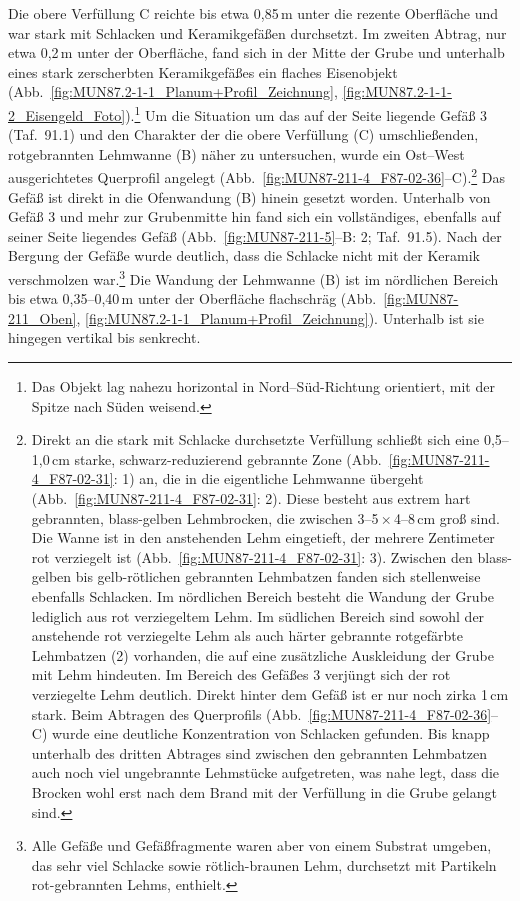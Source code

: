 Die obere Verfüllung C reichte bis etwa 0,85\,m unter die rezente Oberfläche und war stark mit Schlacken und Keramikgefäßen durchsetzt. Im zweiten Abtrag, nur etwa 0,2\,m unter der Oberfläche, fand sich in der Mitte der Grube und unterhalb eines stark zerscherbten Keramikgefäßes ein flaches Eisenobjekt (Abb.~\ref{fig:MUN87.2-1-1_Planum+Profil_Zeichnung}, \ref{fig:MUN87.2-1-1-2_Eisengeld_Foto}).\footnote{Das Objekt lag nahezu horizontal in Nord–Süd-Richtung orientiert, mit der Spitze nach Süden weisend.} Um die Situation um das auf der Seite liegende Gefäß 3 (Taf.~91.1) und den Charakter der die obere Verfüllung (C) umschließenden, rotgebrannten Lehmwanne (B) näher zu untersuchen, wurde ein Ost--West ausgerichtetes Querprofil angelegt (Abb.~\ref{fig:MUN87-211-4_F87-02-36}--C).\footnote{Direkt an die stark mit Schlacke durchsetzte Verfüllung schließt sich eine 0,5--1,0\,cm starke, schwarz-reduzierend gebrannte Zone (Abb.~\ref{fig:MUN87-211-4_F87-02-31}: 1) an, die in die eigentliche Lehmwanne übergeht (Abb.~\ref{fig:MUN87-211-4_F87-02-31}: 2). Diese besteht aus extrem hart gebrannten, blass-gelben Lehmbrocken, die zwischen 3--5\,$\times$\,4--8\,cm groß sind. Die Wanne ist in den anstehenden Lehm eingetieft, der mehrere Zentimeter rot verziegelt ist (Abb.~\ref{fig:MUN87-211-4_F87-02-31}: 3). Zwischen den blass-gelben bis gelb-rötlichen gebrannten Lehmbatzen fanden sich stellenweise ebenfalls Schlacken. Im nördlichen Bereich besteht die Wandung der Grube lediglich aus rot verziegeltem Lehm. Im südlichen Bereich sind sowohl der anstehende rot verziegelte Lehm als auch härter gebrannte rotgefärbte Lehmbatzen (2) vorhanden, die auf eine zusätzliche Auskleidung der Grube mit Lehm hindeuten. Im Bereich des Gefäßes 3 verjüngt sich der rot verziegelte Lehm deutlich. Direkt hinter dem Gefäß ist er nur noch zirka 1\,cm stark. Beim Abtragen des Querprofils (Abb.~\ref{fig:MUN87-211-4_F87-02-36}--C) wurde eine deutliche Konzentration von Schlacken gefunden. Bis knapp unterhalb des dritten Abtrages sind zwischen den gebrannten Lehmbatzen auch noch viel ungebrannte Lehmstücke aufgetreten, was nahe legt, dass die Brocken wohl erst nach dem Brand mit der Verfüllung in die Grube gelangt sind.} Das Gefäß ist direkt in die Ofenwandung (B) hinein gesetzt worden. Unterhalb von Gefäß 3 und mehr zur Grubenmitte hin fand sich ein vollständiges, ebenfalls auf seiner Seite liegendes Gefäß (Abb.~\ref{fig:MUN87-211-5}--B: 2; Taf.~91.5). Nach der Bergung der Gefäße wurde deutlich, dass die Schlacke nicht mit der Keramik verschmolzen war.\footnote{Alle Gefäße und Gefäßfragmente waren aber von einem Substrat umgeben, das sehr viel Schlacke sowie rötlich-braunen Lehm, durchsetzt mit Partikeln rot-gebrannten Lehms, enthielt.} Die Wandung der Lehmwanne (B) ist im nördlichen Bereich bis etwa 0,35--0,40\,m unter der Oberfläche flachschräg (Abb.~\ref{fig:MUN87-211_Oben}, \ref{fig:MUN87.2-1-1_Planum+Profil_Zeichnung}). Unterhalb ist sie hingegen vertikal bis senkrecht.

